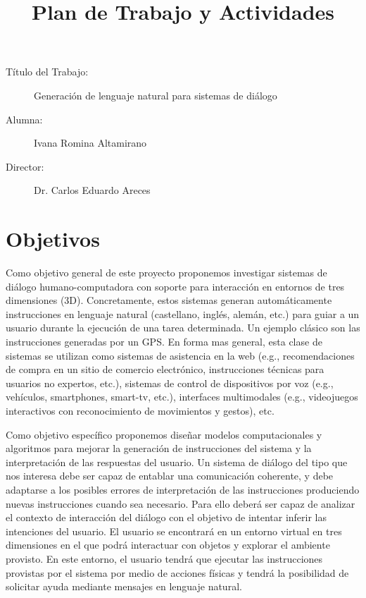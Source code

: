 \documentclass[10.9pt,a4paper]{article}
\title{Plan de Trabajo y Actividades}
\date{}
\begin{document}
\maketitle

\begin{description}
	\item [T\'itulo del Trabajo:] Generaci\'on de lenguaje natural para sistemas de di\'alogo
	\item [Alumna:] Ivana Romina Altamirano
	\item [Director:] Dr. Carlos Eduardo Areces
\end{description}



\section{Objetivos}

Como objetivo general de este proyecto proponemos investigar 
sistemas de di\'alogo humano-computadora con soporte para interacci\'on 
en entornos de tres dimensiones (3D). Concretamente, estos sistemas 
generan autom\'aticamente instrucciones en lenguaje natural (castellano, 
ingl\'es, alem\'an, etc.) para guiar a un usuario durante la 
ejecuci\'on de una tarea determinada. Un ejemplo
cl\'asico son las instrucciones generadas por un GPS. En forma mas general,
esta clase de sistemas se utilizan como sistemas de asistencia en la 
web (e.g., recomendaciones de compra en un sitio de comercio electr\'onico,
instrucciones t\'ecnicas para usuarios no expertos, etc.), sistemas de control 
de dispositivos por voz (e.g., veh\'iculos, smartphones, smart-tv, etc.), interfaces multimodales (e.g., videojuegos interactivos con reconocimiento 
de movimientos y gestos), etc.

Como objetivo espec\'ifico proponemos dise\~nar modelos 
computacionales y algoritmos para mejorar la generaci\'on de 
instrucciones del sistema y la interpretaci\'on de las respuestas del 
usuario. 
Un sistema de di\'alogo del tipo que nos interesa 
debe ser capaz de entablar una comunicaci\'on coherente, y debe 
adaptarse a los posibles errores de interpretaci\'on de las instrucciones 
produciendo nuevas instrucciones cuando sea necesario. Para ello deber\'a 
ser capaz de analizar el contexto de interacci\'on del di\'alogo con el 
objetivo de intentar inferir las intenciones del usuario.
El usuario se encontrar\'a en un entorno virtual en tres dimensiones
en el que podr\'a interactuar con objetos y explorar el ambiente provisto. 
En este entorno, el usuario tendr\'a que ejecutar las instrucciones 
provistas por el sistema por medio de acciones f\'isicas y tendr\'a la 
posibilidad de solicitar ayuda mediante mensajes en lenguaje natural.
\end{document}
